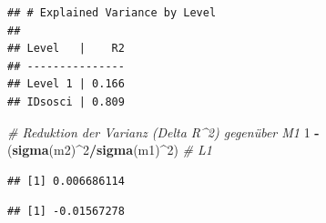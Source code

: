 \documentclass[
]{book}
\newenvironment{Shaded}{\begin{snugshade}}{\end{snugshade}}
\newcommand{\CommentTok}[1]{\textcolor[rgb]{0.56,0.35,0.01}{\textit{#1}}}
\newcommand{\DecValTok}[1]{\textcolor[rgb]{0.00,0.00,0.81}{#1}}
\newcommand{\KeywordTok}[1]{\textcolor[rgb]{0.13,0.29,0.53}{\textbf{#1}}}
\newcommand{\NormalTok}[1]{#1}
\newcommand{\OperatorTok}[1]{\textcolor[rgb]{0.81,0.36,0.00}{\textbf{#1}}}
\newcommand{\StringTok}[1]{\textcolor[rgb]{0.31,0.60,0.02}{#1}}
\begin{document}
\begin{verbatim}
## # Explained Variance by Level
## 
## Level   |    R2
## ---------------
## Level 1 | 0.166
## IDsosci | 0.809
\end{verbatim}

\begin{Shaded}
\begin{Highlighting}[]
\CommentTok{# Reduktion der Varianz (Delta R^2) gegenüber M1}
\DecValTok{1} \OperatorTok{-}\StringTok{ }\NormalTok{(}\KeywordTok{sigma}\NormalTok{(m2)}\OperatorTok{^}\DecValTok{2}\OperatorTok{/}\KeywordTok{sigma}\NormalTok{(m1)}\OperatorTok{^}\DecValTok{2}\NormalTok{)  }\CommentTok{# L1}
\end{Highlighting}
\end{Shaded}

\begin{verbatim}
## [1] 0.006686114
\end{verbatim}

\begin{Shaded}
\end{Shaded}

\begin{verbatim}
## [1] -0.01567278
\end{verbatim}
\end{document}
